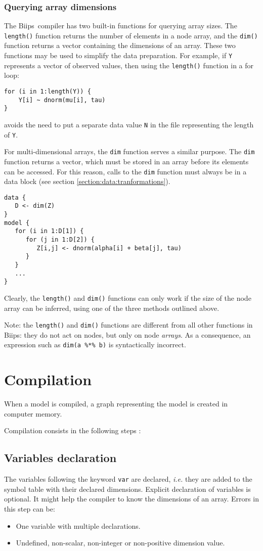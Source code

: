 \documentclass[11pt, a4paper, titlepage]{report}
\newcommand{\biips}{\textsf{Biips}}
\begin{document}
\subsubsection*{Querying array dimensions}  

The \biips\ compiler has two built-in functions for querying array
sizes.  The \verb+length()+ function returns the number of elements in
a node array, and the \verb+dim()+ function returns a vector
containing the dimensions of an array.  These two functions may be
used to simplify the data preparation. For example, if \verb+Y+
represents a vector of observed values, then using the \verb+length()+
function in a for loop:
\begin{verbatim}
for (i in 1:length(Y)) {
    Y[i] ~ dnorm(mu[i], tau)
}
\end{verbatim}
avoids the need to put a separate data value \verb+N+ in the file
representing the length of \verb+Y+.  

For multi-dimensional arrays, the \verb+dim+ function serves a similar
purpose. The \verb+dim+ function returns a vector, which must be stored
in an array before its elements can be accessed. For this reason, calls
to the \verb+dim+ function must always be in a data block (see section
\ref{section:data:tranformations}).
\begin{verbatim}
data {
   D <- dim(Z)
}
model {
   for (i in 1:D[1]) {
      for (j in 1:D[2]) {
         Z[i,j] <- dnorm(alpha[i] + beta[j], tau)
      }
   }
   ...
}
\end{verbatim}
Clearly, the \verb+length()+ and \verb+dim()+ functions can only
work if the size of the node array can be inferred, using one of the
three methods outlined above.

Note: the \verb+length()+ and \verb+dim()+ functions are different
from all other functions in \biips: they do not act on nodes, but only
on node {\em arrays}. As a consequence, an expression such as
\verb+dim(a %*% b)+ is syntactically incorrect.

\section{Compilation}

When a model is compiled, a graph representing the model is created in
computer memory.

Compilation consists in the following steps :
\subsection{Variables declaration}
The variables following the keyword \verb!var! are declared, \textit{i.e.} they are added to the  symbol table with their declared dimensions. Explicit declaration of variables is optional. It might help the compiler to know the dimensions of an array. Errors in this step can be:
\begin{itemize}
\item One variable with multiple declarations.
\item Undefined, non-scalar, non-integer or non-positive dimension value.
\end{itemize}
\end{document}
